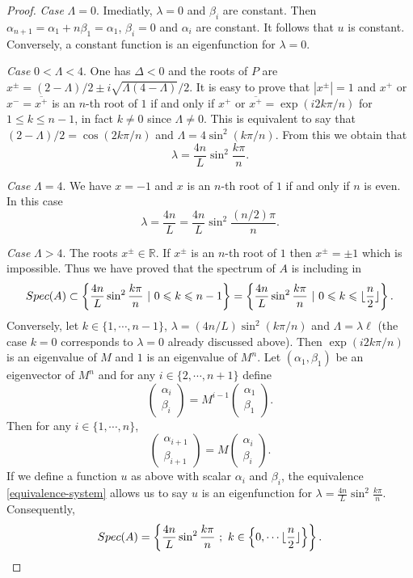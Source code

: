 \documentclass[10pt,a4paper]{amsart}
\newcommand{\R}{\mathbb{R}}
\begin{document}
\begin{proof}
\emph{Case} $\Lambda=0$. Imediatly, $\lambda=0$ and $\beta_i$ are constant. Then $\alpha_{n+1}=\alpha_1+n\beta_1=\alpha_1$, $\beta_i=0$ and $\alpha_i$ are constant. It follows that $u$ is constant. Conversely, a constant function is an eigenfunction for $\lambda=0$. 

 \emph{Case} $0<\Lambda<4$. One has $\Delta<0$ and the roots of $P$ are $x^{\pm}=(2-\Lambda)/2\pm i\sqrt{\Lambda(4-\Lambda)}/2$. It is easy to prove that $|x^{\pm}|=1$ and $x^+$ or $x^-=\overline{x^+}$ is an $n$-th root of $1$ if and only if $x^+$ or $\overline{x^+}=\exp(i2k\pi/n)$ for $1 \leqslant k \leqslant n-1$, in fact $k\neq0$ since $\Lambda\neq0$. This is  equivalent to say that $(2-\Lambda)/2=\cos(2k\pi/n)$ and $\Lambda=4\sin^2(k\pi/n)$.  From this we obtain that $$\lambda=\dfrac{4n}{L}\sin^2\dfrac{k\pi}{n}.$$ 
 
\emph{Case }$\Lambda=4$. We have $x=-1$ and $x$ is an $n$-th root of $1$ if and only if $n$ is even. In this case $$\lambda=\dfrac{4n}{L}=\dfrac{4n}{L}\sin^2\dfrac{(n/2)\pi}{n}.$$

\emph{Case } $\Lambda>4$. The roots $x^{\pm}\in\R$. If $x^{\pm}$ is an $n$-th root of $1$ then $x^{\pm}=\pm 1$ which is impossible. Thus  we have proved that the spectrum of $A$ is including in 
$$\textnormal{Spec}(A)\subset \left\{\frac{4n}{L}\sin^2\frac{k\pi}{n}\ \vert \ 0\leqslant k \leqslant n-1\right\}=\left\{\frac{4n}{L}\sin^2\frac{k\pi}{n}\ \vert\ 0 \leqslant k \leqslant \lfloor\dfrac{n}{2}\rfloor\right\}.$$
Conversely, let $k\in\{1,\cdots,n-1\}$, $\lambda=(4n/L)\sin^2(k\pi/n)$ and $\Lambda=\lambda\ell$ (the case $k=0$ corresponds to $\lambda=0$ already discussed above). Then $\exp(i2k\pi/n)$ is an eigenvalue of $M$ and $1$ is an eigenvalue of $M^n$. Let $(
\alpha_1,\beta_1)$ be an eigenvector of $M^n$ and for any $i\in\{2,\cdots,n+1\}$ define $$\begin{pmatrix}
\alpha_i\\\beta_i
\end{pmatrix}=M^{i-1}\begin{pmatrix}
\alpha_1\\\beta_1
\end{pmatrix}.$$ Then for any $i\in\{1,\cdots,n\}$, $$ \begin{pmatrix}
\alpha_{i+1}\\\beta_{i+1}
\end{pmatrix}=M\begin{pmatrix}
\alpha_i\\\beta_i
\end{pmatrix}.$$ If we define a function $u$ as above with scalar $\alpha_i$ and $\beta_i$, the equivalence \ref{equivalence-system} allows us to say $u$ is an eigenfunction for $\lambda=\frac{4n}{L}\sin^2\frac{k\pi}{n}$. Consequently, $$\textnormal{Spec}(A)=\left\{\frac{4n}{L}\sin^2\frac{k\pi}{n}\ ; \ k\in\left\{0,\cdots\lfloor\dfrac{n}{2}\rfloor\right\}\right\}.$$
\end{proof}  
\end{document}
